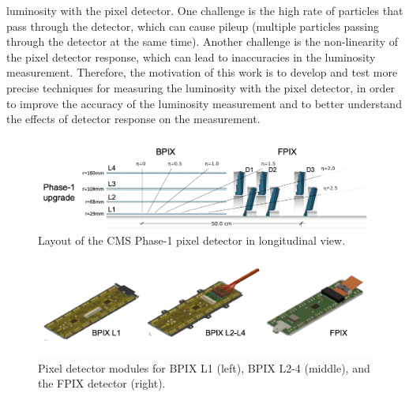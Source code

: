 luminosity with the pixel detector. One challenge is the high rate of particles that pass through the detector, which can cause pileup (multiple particles passing through the detector at the same time). Another challenge is the non-linearity of the pixel detector response, which can lead to inaccuracies in the luminosity measurement. Therefore, the motivation of this work is to develop and test more precise techniques for measuring the luminosity with the pixel detector, in order to improve the accuracy of the luminosity measurement and to better understand the effects of detector response on the measurement.

\begin{figure}[!htp]
\centering
\includegraphics[width=1\textwidth]{ashish_thesis/phaseI_upgrade_pixel_detector.png}
\caption{%
   Layout of the CMS Phase-1 pixel detector in longitudinal view. 
}
\label{fig:phaseI_upgrade}
\end{figure}


\begin{figure}[!htp]
\centering
\includegraphics[width=1\textwidth]{ashish_thesis/silicon_pixel_module.png}
\caption{%
   Pixel detector modules for BPIX L1 (left), BPIX L2-4 (middle), and
the FPIX detector (right). 
}
\label{fig:pixelmodule}
\end{figure}


